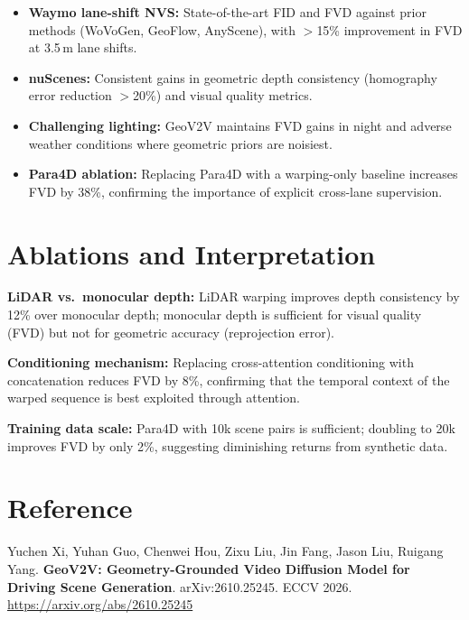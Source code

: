 \documentclass[10pt,twocolumn]{article}
\begin{document}
\begin{itemize}[itemsep=2pt,parsep=0pt]
  \item \textbf{Waymo lane-shift NVS:} State-of-the-art FID and FVD
    against prior methods (WoVoGen, GeoFlow, AnyScene), with
    $>$15\% improvement in FVD at 3.5\,m lane shifts.
  \item \textbf{nuScenes:} Consistent gains in geometric depth
    consistency (homography error reduction $>$20\%) and visual
    quality metrics.
  \item \textbf{Challenging lighting:} GeoV2V maintains FVD gains in
    night and adverse weather conditions where geometric priors are
    noisiest.
  \item \textbf{Para4D ablation:} Replacing Para4D with a warping-only
    baseline increases FVD by 38\%, confirming the importance of
    explicit cross-lane supervision.
\end{itemize}

\section{Ablations and Interpretation}

\textbf{LiDAR vs.\ monocular depth:}
LiDAR warping improves depth consistency by 12\% over monocular
depth; monocular depth is sufficient for visual quality (FVD) but
not for geometric accuracy (reprojection error).

\textbf{Conditioning mechanism:}
Replacing cross-attention conditioning with concatenation reduces FVD
by 8\%, confirming that the temporal context of the warped sequence
is best exploited through attention.

\textbf{Training data scale:}
Para4D with 10k scene pairs is sufficient; doubling to 20k improves
FVD by only 2\%, suggesting diminishing returns from synthetic data.

\section*{Reference}

Yuchen Xi, Yuhan Guo, Chenwei Hou, Zixu Liu, Jin Fang, Jason Liu,
Ruigang Yang.
\textbf{GeoV2V: Geometry-Grounded Video Diffusion Model for Driving
Scene Generation}.
arXiv:2610.25245. ECCV 2026.
\url{https://arxiv.org/abs/2610.25245}
\end{document}
